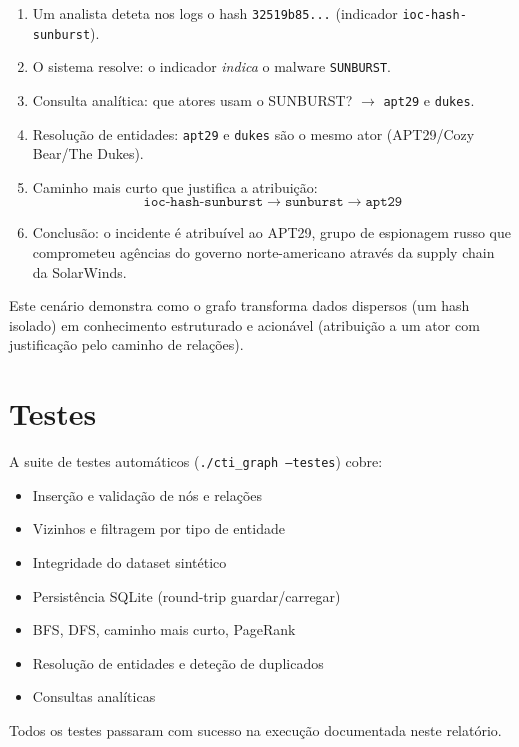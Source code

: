 \documentclass[12pt,a4paper]{article}
\begin{document}
\begin{enumerate}
  \item Um analista deteta nos logs o hash \texttt{32519b85...} (indicador \texttt{ioc-hash-sunburst}).
  \item O sistema resolve: o indicador \emph{indica} o malware \texttt{SUNBURST}.
  \item Consulta analítica: que atores usam o SUNBURST? $\to$ \texttt{apt29} e \texttt{dukes}.
  \item Resolução de entidades: \texttt{apt29} e \texttt{dukes} são o mesmo ator (APT29/Cozy Bear/The Dukes).
  \item Caminho mais curto que justifica a atribuição:
  \[
    \texttt{ioc-hash-sunburst} \to \texttt{sunburst} \to \texttt{apt29}
  \]
  \item Conclusão: o incidente é atribuível ao APT29, grupo de espionagem russo que comprometeu agências do governo norte-americano através da supply chain da SolarWinds.
\end{enumerate}

Este cenário demonstra como o grafo transforma dados dispersos (um hash isolado) em conhecimento estruturado e acionável (atribuição a um ator com justificação pelo caminho de relações).

\section{Testes}

A suite de testes automáticos (\texttt{./cti\_graph --testes}) cobre:

\begin{itemize}
  \item Inserção e validação de nós e relações
  \item Vizinhos e filtragem por tipo de entidade
  \item Integridade do dataset sintético
  \item Persistência SQLite (round-trip guardar/carregar)
  \item BFS, DFS, caminho mais curto, PageRank
  \item Resolução de entidades e deteção de duplicados
  \item Consultas analíticas
\end{itemize}

\medskip
\noindent Todos os testes passaram com sucesso na execução documentada neste relatório.
\end{document}
